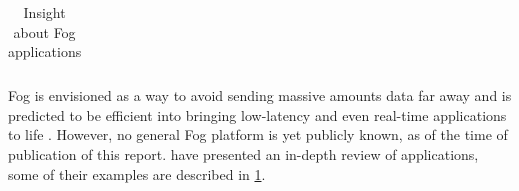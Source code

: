 \documentclass[11pt]{sdm}
\begin{document}
\begin{table}[t]
\begin{tabular}{|p{3cm}|p{12cm}|}
		\hline
	\end{tabular}
	\caption{\label{tab:applications}Insight about Fog applications \cite{ahmed_fog_2019}}
\end{table}

Fog is envisioned as a way to avoid sending massive amounts data far away and is predicted to be efficient into bringing low-latency and even real-time applications to life \cite{ahmed_fog_2019}. However, no general Fog platform is yet publicly known, as of the time of publication of this report. \citet{ahmed_fog_2019} have presented an in-depth review of applications, some of their examples are described in \ref{tab:applications}.
\end{document}
